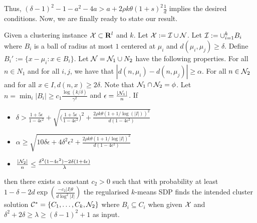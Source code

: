 Thus, $(\delta-1)^2 -1 - a^2 - 4a > a + 2\rho k\theta(1+s)^2\frac{1}{d}$ implies the desired conditions. Now, we are finally ready to state our result.

\begin{theorem}
\label{a-thm:regSDPIsometric}
Given a clustering instance $\mathcal X \subset \mathbf R^l$ and $k$. Let $\mathcal X : = \mathcal I \cup \mathcal N$. Let $\mathcal I := \cup_{i=1}^k B_i$ where $B_i$ is a ball of radius at most $1$ centered at $\mu_i$ and $d(\mu_i, \mu_j) \ge \delta $. Define $B_i' := \{x - \mu_i : x \in B_i\}$. Let $\mathcal N = \mathcal N_1 \cup N_2$ have the following properties. For all $n \in N_1$ and for all $i, j$, we have that $| d(n, \mu_i) - d(n, \mu_j)| \ge \alpha$. For all $n \in \mathcal N_2$ and for all $x \in I, d(n, x) \ge 2\delta$. Note that $\mathcal N_1 \cap \mathcal N_2 = \phi$. Let $n = \min_i |B_i| \ge c_1\frac{\log(k/\delta)}{\gamma^2}$ and $\epsilon = \frac{|\mathcal N_1|}{n}$. If  

\begin{itemize}
  \item $\delta > \frac{1+5\epsilon}{1-4\epsilon^2} + \sqrt{ \Big(\frac{1+5\epsilon}{1-4\epsilon^2}\Big)^2 + \frac{2\rho k\theta(1+1/\log(|I|))^2}{d(1-4\epsilon^2)}}$ 
  \item $\alpha \ge \sqrt{10\delta \epsilon + 4\delta^2 \epsilon^2+ \frac{2\rho k\theta(1+1/\log|I|)^2}{d(1-4\epsilon^2)}}$ 
  \item $\frac{|\mathcal N_2|}{n} \le \frac{\delta^2(1-4\epsilon^2)-2\delta(1+4\epsilon)}{\lambda}$
\end{itemize}
then there exists a constant $c_2 > 0$ such that with probability at least $1-\delta - 2d\exp(\frac{-c_2|I|\theta}{d\log^2|I|})$ the regularised $k$-means SDP finds the intended cluster solution  $\mathcal C^* = \{C_1, \ldots, C_k, \mathcal N_2\}$ where $B_i \subseteq C_i$ when given $\mathcal X$ and $\delta^2+2\delta \ge \lambda \ge (\delta-1)^2 + 1$ as input.
\end{theorem}

